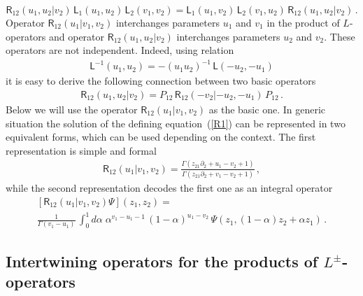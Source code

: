 \documentclass[11pt]{article}
\numberwithin{equation}{section}
\theoremstyle{plain}
\theoremstyle{definition}
\def\dd{\partial}
\newcommand{\R}{\mathsf{R}}
\begin{document}
\begin{equation}
	\R_{12}(u_1,u_2|v_2)\,
	\mathsf{L}_{1}(u_1,u_2)\,\mathsf{L}_{2}(v_1,v_2)=
	\mathsf{L}_{1}(u_1,v_2)\,\mathsf{L}_{2}(v_1,u_2)\,
	\R_{12}(u_1,u_2|v_2)\,. \label{R2}
\end{equation}
Operator $\R_{12}(u_1|v_1,v_2)$ interchanges 
parameters $u_1$ and $v_1$ in the product of $L$-operators and 
operator $\R_{12}(u_1,u_2|v_2)$ interchanges 
parameters $u_2$ and $v_2$.
These operators are not independent. Indeed, using relation 
\begin{align}
	\mathsf{L}^{-1}(u_1,u_2) = -(u_1 u_2)^{-1}\,\mathsf{L}(-u_2,-u_1) 
\end{align} 
it is easy to derive the following connection between two basic operators   
\begin{align}
	\R_{12}(u_1,u_2|v_2) = P_{12}\,\R_{12}(-v_2|-u_2,-u_1)\,P_{12}\,.
\end{align}
Below we will use the operator $\R_{12}(u_1|v_1,v_2)$ as the basic one. 
In generic situation the solution of the defining equation~(\ref{R1}) 
can be represented in two equivalent forms, which
can be used depending on the context.
The first representation is simple and formal      
\begin{align}
	\R_{12}(u_1|v_1,v_2) =
	\frac{\Gamma(z_{21}\dd_2+u_1-v_2+1)}{\Gamma(z_{21}\dd_2+v_1-v_2+1)}\,,
\end{align}
while the second representation decodes the first one as an integral operator
\begin{multline}\label{intR12}
	\left[\R_{12}(u_1|v_1,v_2)\Psi\right](z_1,z_2) = \\
	\frac{1}{\Gamma(v_1-u_1)}\,\int_{0}^1 d\alpha\; \alpha^{v_1-u_1-1} \,
	(1-\alpha)^{u_1-v_2}\,\Psi(z_1,(1-\alpha)z_2+\alpha z_1)\,.
\end{multline}

\subsection{Intertwining operators for the products of $L^{\pm}$-operators}
\end{document}
